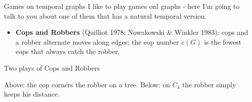 \documentclass[10pt, compress]{beamer}
\newtheorem{conj}{Conjecture}
\begin{document}









\begin{frame}{Games on temporal graphs}
I like to play games onl graphs - here I'm going to talk to you about one of them that has a natural temporal version.

\bigskip

\begin{itemize}
\item \textbf{Cops and Robbers} (Quilliot 1978; Nowakowski \& Winkler 1983): cops and a robber alternate moves along edges; the cop number $c(G)$ is the fewest cops that always catch the robber.
\end{itemize}



\end{frame}


\begin{frame}{Two plays of Cops and Robbers}
\begin{center}
\resizebox{0.95\linewidth}{!}{}
\end{center}

\medskip

{\small Above: the cop corners the robber on a tree. Below: on $C_4$ the robber simply keeps his distance.}
\end{frame}
\end{document}
